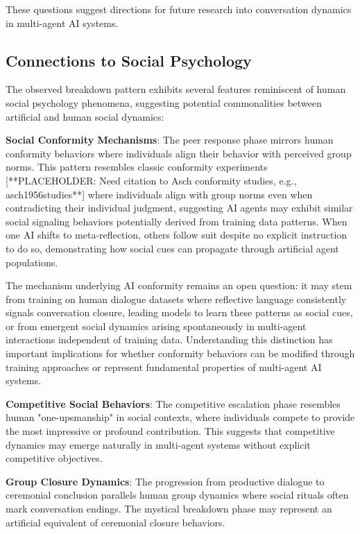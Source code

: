 \documentclass[11pt,letterpaper]{article}
\begin{document}
These questions suggest directions for future research into conversation dynamics in multi-agent AI systems.

\subsection{Connections to Social Psychology}

The observed breakdown pattern exhibits several features reminiscent of human social psychology phenomena, suggesting potential commonalities between artificial and human social dynamics:

\textbf{Social Conformity Mechanisms}: The peer response phase mirrors human conformity behaviors where individuals align their behavior with perceived group norms. This pattern resembles classic conformity experiments [**PLACEHOLDER: Need citation to Asch conformity studies, e.g., asch1956studies**] where individuals align with group norms even when contradicting their individual judgment, suggesting AI agents may exhibit similar social signaling behaviors potentially derived from training data patterns. When one AI shifts to meta-reflection, others follow suit despite no explicit instruction to do so, demonstrating how social cues can propagate through artificial agent populations.

The mechanism underlying AI conformity remains an open question: it may stem from training on human dialogue datasets where reflective language consistently signals conversation closure, leading models to learn these patterns as social cues, or from emergent social dynamics arising spontaneously in multi-agent interactions independent of training data. Understanding this distinction has important implications for whether conformity behaviors can be modified through training approaches or represent fundamental properties of multi-agent AI systems.

\textbf{Competitive Social Behaviors}: The competitive escalation phase resembles human "one-upsmanship" in social contexts, where individuals compete to provide the most impressive or profound contribution. This suggests that competitive dynamics may emerge naturally in multi-agent systems without explicit competitive objectives.

\textbf{Group Closure Dynamics}: The progression from productive dialogue to ceremonial conclusion parallels human group dynamics where social rituals often mark conversation endings. The mystical breakdown phase may represent an artificial equivalent of ceremonial closure behaviors.
\end{document}
